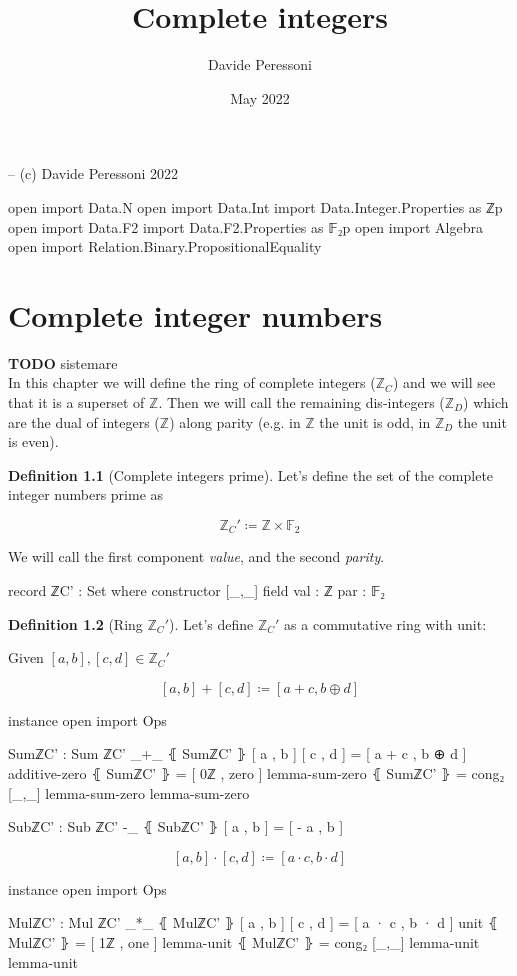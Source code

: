 \documentclass[a4paper]{report}
\title{Complete integers}
\author{Davide Peressoni}
\date{May 2022}
\theoremstyle{definition}
\newtheorem{definition}{Definition}
\theoremstyle{lemma}
\theoremstyle{theorem}
\newcommand\bZ{\mathbb{Z}}
\newcommand\bF{\mathbb{F}}
\begin{document}
\maketitle

\begin{code}
-- (c) Davide Peressoni 2022

open import Data.N
open import Data.Int
import Data.Integer.Properties as ℤp
open import Data.F2
import Data.F2.Properties as 𝔽₂p
open import Algebra
open import Relation.Binary.PropositionalEquality
\end{code}

\chapter{Complete integer numbers}

\textbf{TODO} sistemare\\
In this chapter we will define the ring of complete integers ($\bZ_C$) and we will
see that it is a superset of $\bZ$. Then we will call the remaining dis-integers
($\bZ_D$) which are the dual of integers ($\bZ$) along parity (e.g. in $\bZ$ the unit is
odd, in $\bZ_D$ the unit is even).

\begin{definition}[Complete integers prime]
Let's define the set of the complete integer numbers prime as

\[\bZ_C' \coloneqq \bZ\times\bF_2\]

We will call the first component \emph{value}, and the second \emph{parity}.

\begin{code}
record ℤC' : Set where
  constructor [_,_]
  field
    val : ℤ
    par : 𝔽₂
\end{code}
\end{definition}

\begin{definition}[Ring $\bZ_C'$]
Let's define $\bZ_C'$ as a commutative ring with unit:

Given $[a,b], [c,d] \in \bZ_C'$

\[[a,b] + [c,d] \coloneqq [a+c, b\oplus d]\]

\begin{code}
instance
  open import Ops

  SumℤC' : Sum ℤC'
  _+_ ⦃ SumℤC' ⦄ [ a , b ] [ c , d ] = [ a + c , b ⊕ d ]
  additive-zero ⦃ SumℤC' ⦄ = [ 0ℤ , zero ]
  lemma-sum-zero ⦃ SumℤC' ⦄ = cong₂ [_,_] lemma-sum-zero lemma-sum-zero

  SubℤC' : Sub ℤC'
  -_ ⦃ SubℤC' ⦄ [ a , b ] = [ - a , b ]
\end{code}

\[[a,b] \cdot [c,d] \coloneqq [a\cdot c, b\cdot d]\]

\begin{code}
instance
  open import Ops

  MulℤC' : Mul ℤC'
  _*_ ⦃ MulℤC' ⦄ [ a , b ] [ c , d ] = [ a · c , b · d ]
  unit ⦃ MulℤC' ⦄ = [ 1ℤ , one ]
  lemma-unit ⦃ MulℤC' ⦄ = cong₂ [_,_] lemma-unit lemma-unit
\end{code}
\end{definition}
\end{document}
